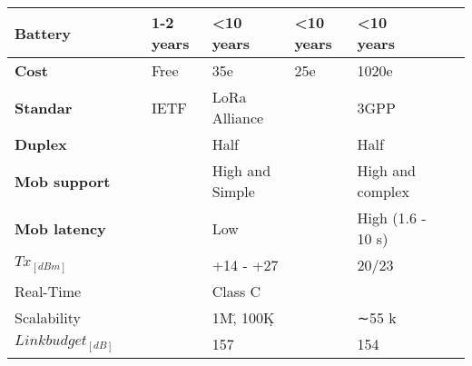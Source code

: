 \begin{longtable}{l|l|l|l|l|l|l|l}
	\bf{Battery}                         & \                & 1-2	years    & <10 years              & <10 years     & <10 years                              &                   & \\\hline
	\bf{Cost}                            &                  & Free         & 35e                    & 25e           & 1020e                                  &                   & \\\hline
	\bf{Standar}                         &                  & IETF         & LoRa	Alliance          &               & 3GPP                                   &                   & \\\hline
	\bf{Duplex}                          &                  &              & Half                   &               & Half                                   &                   & \\\hline
	\bf{Mob support}           		     &                  &              & High and Simple        &               & High and complex                       &                   & \\\hline
	\bf{Mob latency}            		 &                  &              & Low                    &               & High (1.6 - 10 s)                      &                   & \\\hline
	\bf{$Tx_{[dBm]}$}                    &                  &              & +14 - +27              &               & 20/23                                  &                   & \\\hline
	Real-Time                            &                  &              & Class C                &               & \ko                                    &                   & \\\hline
	Scalability                          &                  &              & 1M\u, 100K\d           &               & ∼55 k                                  &                   & \\\hline
	$Link budget_{[dB]}$                 &                  &              & 157                    &               & 154                                    &                   & \\\hline

\end{longtable}
